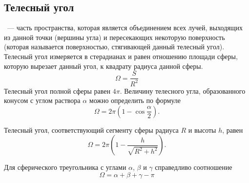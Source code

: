\subsection{Телесный угол}
\label{subsec:solid-angle}
~--- часть пространства, которая является объединением всех лучей, выходящих из данной точки (вершины угла) и пересекающих некоторую поверхность (которая называется поверхностью, стягивающей данный телесный угол). Телесный угол измеряется в стерадианах и равен отношению площади сферы, которую вырезает данный угол, к квадрату радиуса данной сферы.
\begin{equation}
	\Omega = \frac{S}{R^2}
\end{equation}
Телесный угол полной сферы равен $4\pi$. Величину телесного угла, образованного конусом с углом раствора $\alpha$ можно определить по формуле
\begin{equation}
	\Omega = 2 \pi \left(1 - \cos \frac{\alpha}{2}\right).
\end{equation}

Телесный угол, соответствующий сегменту сферы радиуса $R$ и высоты $h$, равен
\begin{equation}
	\Omega = 2 \pi \left(1 - \dfrac{h}{\sqrt{R^2 + h^2}}\right).
\end{equation}

Для сферического треугольника с углами $\alpha$, $\beta$ и $\gamma$ справедливо соотношение
\begin{equation}
	\Omega = \alpha + \beta + \gamma - \pi
\end{equation}
